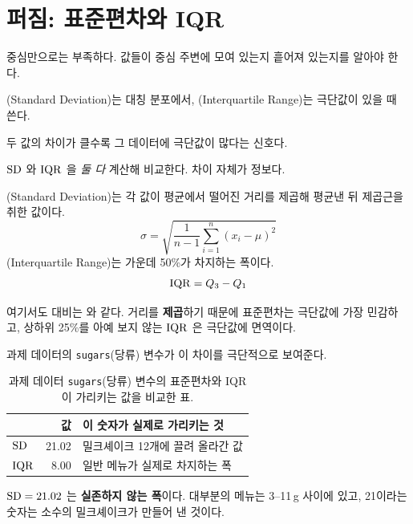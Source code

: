 \section{퍼짐: 표준편차와 IQR}
\label{sec:spread}

\begin{inbrief}
  \item[Why] 중심만으로는 부족하다. 값들이 중심 주변에 모여 있는지 흩어져 있는지를
             알아야 한다.
  \item[When] (Standard Deviation)는 대칭 분포에서, (Interquartile Range)는 극단값이 있을 때 쓴다.
  \item[Where] 두 값의 차이가 클수록 그 데이터에 극단값이 많다는 신호다.
  \item[How] $\mathrm{SD}$ 와 $\mathrm{IQR}$ 을 \emph{둘 다} 계산해 비교한다. 차이 자체가 정보다.
\end{inbrief}

\begin{definition}[퍼짐의 두 정의]
\label{def:spread}
(Standard Deviation)는 각 값이 평균에서 떨어진 거리를 제곱해
평균낸 뒤 제곱근을 취한 값이다.
\[
  \sigma = \sqrt{\frac{1}{n-1}\sum_{i=1}^{n}(x_i - \mu)^2}
\]
(Interquartile Range)는 가운데 50\%가 차지하는 폭이다.
\[
  \mathrm{IQR} = Q_3 - Q_1
\]
\end{definition}

여기서도 대비는 와 같다. 거리를 \textbf{제곱}하기 때문에
표준편차는 극단값에 가장 민감하고, 상하위 25\%를 아예 보지 않는 $\mathrm{IQR}$ 은
극단값에 면역이다.

과제 데이터의 \texttt{sugars}(당류) 변수가 이 차이를 극단적으로 보여준다.

\begin{table}[H]\centering
\caption{과제 데이터 \texttt{sugars}(당류) 변수의 표준편차와 IQR이
가리키는 값을 비교한 표.}
\label{tab:desc-sd-vs-iqr-sugars}
\begin{tabularx}{0.85\linewidth}{@{}l r X@{}}
\toprule
 & 값 & 이 숫자가 실제로 가리키는 것 \\
\midrule
$\mathrm{SD}$  & 21.02 & 밀크셰이크 12개에 끌려 올라간 값 \\
\midrule
$\mathrm{IQR}$ &  8.00 & 일반 메뉴가 실제로 차지하는 폭 \\
\bottomrule
\end{tabularx}
\end{table}

$\mathrm{SD} = 21.02$ 는 \textbf{실존하지 않는 폭}이다. 대부분의 메뉴는 3--11\,g 사이에
있고, 21이라는 숫자는 소수의 밀크셰이크가 만들어 낸 것이다.

